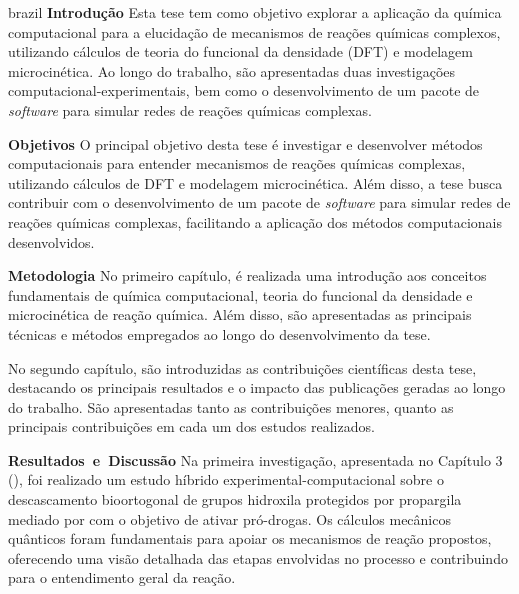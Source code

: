 \begin{resumo}
	\begin{otherlanguage*}{brazil}
		\textbf{Introdução}\linebreak
		Esta tese tem como objetivo explorar a aplicação da química computacional para a elucidação de mecanismos de reações químicas complexos,
		utilizando cálculos de teoria do funcional da densidade (DFT) e modelagem microcinética.
		Ao longo do trabalho,
		são apresentadas duas investigações computacional-experimentais,
		bem como o desenvolvimento de um pacote de \emph{software} para simular redes de reações químicas complexas.

		\textbf{Objetivos}\linebreak
		O principal objetivo desta tese é investigar e desenvolver métodos computacionais para entender mecanismos de reações químicas complexas,
		utilizando cálculos de DFT e modelagem microcinética.
		Além disso,
		a tese busca contribuir com o desenvolvimento de um pacote de \emph{software} para simular redes de reações químicas complexas,
		facilitando a aplicação dos métodos computacionais desenvolvidos.

		\textbf{Metodologia}\linebreak
		No primeiro capítulo,
		é realizada uma introdução aos conceitos fundamentais de química computacional,
		teoria do funcional da densidade e microcinética de reação química.
		Além disso,
		são apresentadas as principais técnicas e métodos empregados ao longo do desenvolvimento da tese.

		No segundo capítulo,
		são introduzidas as contribuições científicas desta tese,
		destacando os principais resultados e o impacto das publicações geradas ao longo do trabalho.
		São apresentadas tanto as contribuições menores,
		quanto as principais contribuições em cada um dos estudos realizados.

		\mbox{\textbf{Resultados~e~Discussão}}\linebreak
		Na primeira investigação,
		apresentada no Capítulo 3 (),
		foi realizado um estudo híbrido experimental-computacional sobre o descascamento bioortogonal de grupos hidroxila protegidos por propargila mediado por  com o objetivo de ativar pró-drogas.
		Os cálculos mecânicos quânticos foram fundamentais para apoiar os mecanismos de reação propostos,
		oferecendo uma visão detalhada das etapas envolvidas no processo e contribuindo para o entendimento geral da reação.


\end{otherlanguage*}
\end{resumo}
